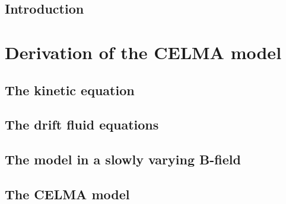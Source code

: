 \documentclass[12pt,a4paper,oneside,openright]{report} %
\title{\thesisTitle}
\author{\authorName}
\date{\thesisDate}
\begin{document}
%
\cleardoublepage
\clearpage



\cleardoublepage
\clearpage
{} %


\cleardoublepage
\clearpage
{} %

\setcounter{page}{4}

\cleardoublepage
\clearpage

\setcounter{page}{5}
\tableofcontents

\cleardoublepage
\clearpage



\chapter{Introduction}
\label{chap:intro}


\part{Derivation of the CELMA model}
\label{part:CELMA}
\chapter{The kinetic equation}
\label{chap:kin}


\chapter{The drift fluid equations}
\label{chap:drift-order}


\chapter{The model in a slowly varying B-field}
\label{chap:slowB}


\chapter{The CELMA model}
\label{chap:CELMA}





\end{document}
